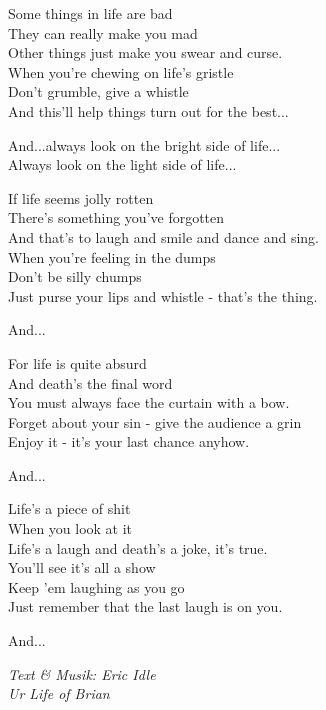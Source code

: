 \vspace{10pt}
Some things in life are bad\\
They can really make you mad\\
Other things just make you swear and curse.\\
When you're chewing on life's gristle\\
Don't grumble, give a whistle\\
And this'll help things turn out for the best...\par
\vspace{10pt}
And...always look on the bright side of life...\\
Always look on the light side of life...\par
\vspace{10pt}
If life seems jolly rotten\\
There's something you've forgotten\\
And that's to laugh and smile and dance and sing.\\
When you're feeling in the dumps\\
Don't be silly chumps\\
Just purse your lips and whistle - that's the thing.\par
\vspace{10pt}
And...\par
\vspace{10pt}
For life is quite absurd\\
And death's the final word\\
You must always face the curtain with a bow.\\
Forget about your sin - give the audience a grin\\
Enjoy it - it's your last chance anyhow.\par
\vspace{10pt}
And...\par
\vspace{10pt}
Life's a piece of shit\\
When you look at it\\
Life's a laugh and death's a joke, it's true.\\
You'll see it's all a show\\
Keep 'em laughing as you go\\
Just remember that the last laugh is on you.\par
\vspace{10pt}
And...\par
\vspace{10pt}
{\footnotesize\textit{Text \& Musik: Eric Idle \\ Ur Life of Brian}}

